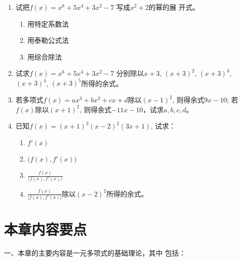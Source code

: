 \begin{enumerate}
\item 试把$f(x)=x^6+5x^4+3x^2-7$ 写成$x^2+2$的幂的展
开式。
\begin{multicols}{3}
    \begin{enumerate}
        \item 用特定系数法
        \item 用泰勒公式法
        \item 用综合除法
    \end{enumerate}
\end{multicols}
\item 试求$f(x)=x^6+5x^4+3x^2-7$ 分别除以$x+3$,
$(x+3)^2$, $(x+3)^3$, $(x+3)^4$, $(x+3)^5$所得的余式。

\item 若多项式$f(x)=ax^3+bx^2+cx+d$除以$(x-1)^2$, 则得余式$9x-10$; 若$f(x)$除以$(x+1)^2$, 则得余式$-11x-10$，试求$a,b,c,d$。

\item 已知$f(x)=(x+1)^3(x-2)^2(3x+1)$, 试求：
\begin{enumerate}
    \item $f' (x)$
    \item $\big(f(x),f'(x)\big)$
    \item $\frac{f(x)}{\big(f(x),f'(x)\big)}$
    \item $\frac{f(x)}{\big[f(x),f'(x)\big]}$除以$(x-2)^2$所得的余式。
\end{enumerate}
\end{enumerate}

\section*{本章内容要点}

一、本章的主要内容是一元多项式的基础理论，其中
包括：

